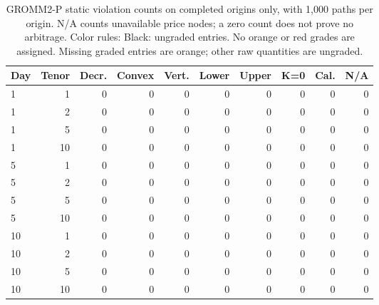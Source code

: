 \documentclass[11pt]{article}
\begin{document}
\begin{table}[H]\centering\small\setlength{\tabcolsep}{4pt}
\caption{GROMM2-P static violation counts on completed origins only, with 1,000 paths per origin. N/A counts unavailable price nodes; a zero count does not prove no arbitrage. Color rules: Black: ungraded entries. No orange or red grades are assigned. Missing graded entries are orange; other raw quantities are ungraded.}\label{tab:gromm2-p-static}
\begin{tabular}{@{}lrrrrrrrrr@{}}
\toprule
Day & Tenor & Decr. & Convex & Vert. & Lower & Upper & K=0 & Cal. & N/A \\
\midrule
1 & 1 & 0 & 0 & 0 & 0 & 0 & 0 & 0 & 0 \\
1 & 2 & 0 & 0 & 0 & 0 & 0 & 0 & 0 & 0 \\
1 & 5 & 0 & 0 & 0 & 0 & 0 & 0 & 0 & 0 \\
1 & 10 & 0 & 0 & 0 & 0 & 0 & 0 & 0 & 0 \\
5 & 1 & 0 & 0 & 0 & 0 & 0 & 0 & 0 & 0 \\
5 & 2 & 0 & 0 & 0 & 0 & 0 & 0 & 0 & 0 \\
5 & 5 & 0 & 0 & 0 & 0 & 0 & 0 & 0 & 0 \\
5 & 10 & 0 & 0 & 0 & 0 & 0 & 0 & 0 & 0 \\
10 & 1 & 0 & 0 & 0 & 0 & 0 & 0 & 0 & 0 \\
10 & 2 & 0 & 0 & 0 & 0 & 0 & 0 & 0 & 0 \\
10 & 5 & 0 & 0 & 0 & 0 & 0 & 0 & 0 & 0 \\
10 & 10 & 0 & 0 & 0 & 0 & 0 & 0 & 0 & 0 \\
\bottomrule\end{tabular}\end{table}
\end{document}
